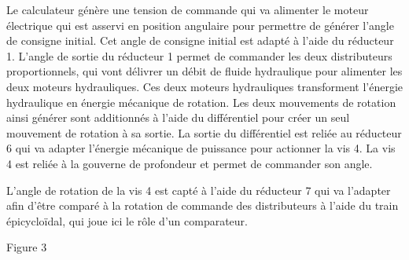 \documentclass[11pt,oneside]{article}
\begin{document}
Le calculateur génère une tension de commande qui va alimenter le moteur électrique qui est asservi en
position angulaire pour permettre de générer l’angle de consigne initial. Cet angle de consigne initial est
adapté à l’aide du réducteur 1. L’angle de sortie du réducteur 1 permet de commander les deux
distributeurs proportionnels, qui vont délivrer un débit de fluide hydraulique pour alimenter les deux
moteurs hydrauliques. Ces deux moteurs hydrauliques transforment l’énergie hydraulique en énergie
mécanique de rotation. Les deux mouvements de rotation ainsi générer sont additionnés à l’aide du
différentiel pour créer un seul mouvement de rotation à sa sortie. La sortie du différentiel est reliée
au réducteur 6 qui va adapter l’énergie mécanique de puissance pour actionner la vis 4. La vis 4 est
reliée à la gouverne de profondeur et permet de commander son angle.

L’angle de rotation de la vis 4 est capté à l’aide du réducteur 7 qui va l’adapter afin d’être comparé à la
rotation de commande des distributeurs à l’aide du train épicycloïdal, qui joue ici le rôle d’un
comparateur.


%
%
%

\begin{center}

Figure 3
\end{center}
\end{document}
